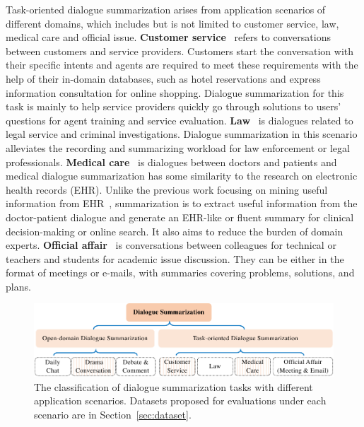 Task-oriented dialogue summarization arises from application scenarios of different domains, which includes but is not limited to customer service, 
law, medical care and official issue.
\textbf{Customer service}~\cite{zou2021topic,feigenblat-etal-2021-tweetsumm-dialog,zhao2021todsum,liu2019automatic,chen2020jddc} refers to conversations between customers and service providers.
Customers start the conversation with their specific intents and agents are required to meet these requirements with the help of their in-domain databases, such as hotel reservations and express information consultation for online shopping. Dialogue summarization for this task is mainly to help service providers quickly go through solutions to users' questions for agent training and service evaluation. 
\textbf{Law}~\cite{fuzw20,duan2019legal,xi2020global} is dialogues related to legal service and 
criminal investigations. Dialogue summarization in this scenario alleviates the recording and summarizing workload 
for law enforcement or legal professionals. 
\textbf{Medical care}~\cite{joshi2020dr,song2020summarizing,song2020summarizing,zhang2021leveraging,liu2019topic} is dialogues between doctors and patients and medical dialogue summarization has some similarity to the research on electronic health records (EHR). Unlike the previous work focusing on mining useful information from EHR~\cite{yadav2018mining}, summarization is to extract useful information from the doctor-patient dialogue and generate an EHR-like or fluent summary for clinical decision-making or online search. It also aims to reduce the burden of domain experts.
\textbf{Official affair}~\cite{carletta2005ami,janin2003icsi,ulrich2008publicly,zhang2021emailsum} is conversations between colleagues for technical or teachers and students for academic issue discussion. They can be either in the format of meetings or e-mails, with summaries covering problems, solutions, and plans.


\begin{figure}
	\centering
	\includegraphics[scale=0.8]{fig/scenarios.pdf}
	\caption{The classification of dialogue summarization tasks with different application scenarios. Datasets proposed for evaluations under each scenario are in Section~\ref{sec:dataset}.}
	\label{fig:scenario}
\end{figure}


